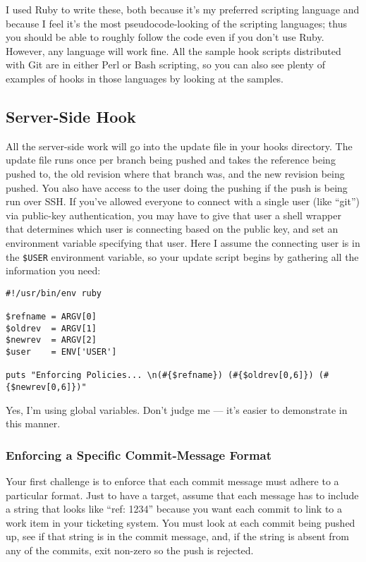 \documentclass[a4paper]{book}
\begin{document}
I used Ruby to write these, both because it's my preferred scripting language and because I feel it's the most pseudocode-looking of the scripting languages; thus you should be able to roughly follow the code even if you don't use Ruby. However, any language will work fine. All the sample hook scripts distributed with Git are in either Perl or Bash scripting, so you can also see plenty of examples of hooks in those languages by looking at the samples.

\subsection{Server-Side Hook}

All the server-side work will go into the update file in your hooks directory. The update file runs once per branch being pushed and takes the reference being pushed to, the old revision where that branch was, and the new revision being pushed. You also have access to the user doing the pushing if the push is being run over SSH. If you've allowed everyone to connect with a single user (like “git”) via public-key authentication, you may have to give that user a shell wrapper that determines which user is connecting based on the public key, and set an environment variable specifying that user. Here I assume the connecting user is in the \texttt{\$USER} environment variable, so your update script begins by gathering all the information you need:

\begin{shaded}\begin{verbatim}
#!/usr/bin/env ruby

$refname = ARGV[0]
$oldrev  = ARGV[1]
$newrev  = ARGV[2]
$user    = ENV['USER']

puts "Enforcing Policies... \n(#{$refname}) (#{$oldrev[0,6]}) (#{$newrev[0,6]})"
\end{verbatim}\end{shaded}

Yes, I'm using global variables. Don't judge me --- it's easier to demonstrate in this manner.

\subsubsection{Enforcing a Specific Commit-Message Format}

Your first challenge is to enforce that each commit message must adhere to a particular format. Just to have a target, assume that each message has to include a string that looks like “ref: 1234” because you want each commit to link to a work item in your ticketing system. You must look at each commit being pushed up, see if that string is in the commit message, and, if the string is absent from any of the commits, exit non-zero so the push is rejected.
\end{document}
